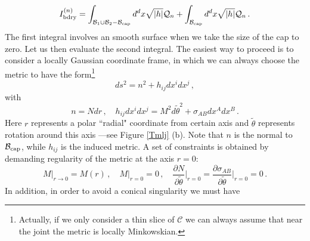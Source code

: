 \documentclass[11pt,letterpaper]{article}
\begin{document}
\begin{equation}
I_{\rm bdry}^{(n)}=\int_{\mathcal{B}_1\cup\mathcal{B}_2-\mathcal{B}_{\rm cap}}d^{d}x\sqrt{|h|}\mathcal{Q}_{n}+\int_{\mathcal{B}_{\rm cap}}d^{d}x\sqrt{|h|}\mathcal{Q}_{n}\, .
\end{equation}
The first integral involves an smooth surface when we take the size of the cap to zero. Let us then evaluate the second integral. The easiest way to proceed is to consider a locally Gaussian coordinate frame, in which we can always choose the metric to have the form\footnote{Actually, if we only consider a thin slice of $\mathcal{C}$ we can always assume that near the joint the metric is locally Minkowskian.}
\begin{equation}
ds^2=n^2+h_{ij}dx^{i}dx^{j}\, ,
\end{equation} 
with
\begin{equation}
n=N dr\, ,\quad h_{ij}dx^{i}dx^{j}=M^2 d\tilde\theta^2+\sigma_{AB}dx^{A}dx^{B}\, .
\end{equation} 
Here $r$ represents a polar ``radial" coordinate from certain axis and $\tilde\theta$ represents rotation around this axis ---see Figure \ref{Tmlj} (b). Note that $n$ is the normal to $\mathcal{B}_{\rm cap}$, while $h_{ij}$ is the induced metric. A set of constraints is obtained by demanding regularity of the metric at the axis $r=0$:
\begin{equation}
M\Big|_{r\rightarrow 0} =M(r)\, , \quad M\Big|_{r= 0} =0\, ,\quad \frac{\partial N}{\partial\tilde\theta}\Big|_{r=0}=\frac{\partial \sigma_{AB}}{\partial\tilde\theta}\Big|_{r=0}=0\, .
\end{equation}
In addition, in order to avoid a conical singularity we must have
\end{document}
